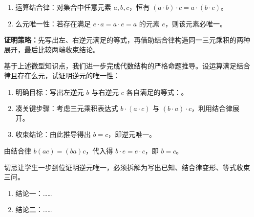 \begin{probchain}
\begin{microknowledge}[重要概念/性质]
\begin{enumerate}
    \item 运算结合律：对集合中任意元素 $a, b, c$，恒有 $(a \cdot b) \cdot c = a \cdot (b \cdot c)$。
    \item 么元唯一性：若存在满足 $e \cdot a = a \cdot e = a$ 的元素 $e$，则该元素必唯一。
\end{enumerate}
\end{microknowledge}

\textbf{证明策略：}先写出左、右逆元满足的等式，再借助结合律构造同一三元乘积的两种展开，最后比较两端收束结论。

\item {} 基于上述微型知识点，我们进一步完成代数结构的严格命题推导。设运算满足结合律且存在么元，试证明逆元的唯一性：
\begin{enumerate}
    \item 明确目标：写出左逆元 $b$ 与右逆元 $c$ 各自满足的等式：\fillin[$ba=e$，$ac=e$]{25mm}。
    \ansspace{1.2cm}
    \item 凑关键步骤：考虑三元乘积表达式 $b \cdot (a \cdot c)$ 与 $(b \cdot a) \cdot c$，利用结合律展开。
    \ansspace{1.5cm}
    \item 收束结论：由此推导得出 $b = c$，即逆元唯一。
    \ansspace{1.2cm}
\end{enumerate}
\begin{solution}
由结合律 $b(ac) = (ba)c$，代入得 $b \cdot e = e \cdot c$，即 $b = c$。
\end{solution}
\begin{teacherNote}
切忌让学生一步到位证明逆元唯一，必须拆解为写出已知、结合律变形、等式收束三问。
\end{teacherNote}

\end{probchain}

\begin{knowledgebox}[本节结论]
\begin{enumerate}
  \item 结论一：……
  \item 结论二：……
\end{enumerate}
\end{knowledgebox}
